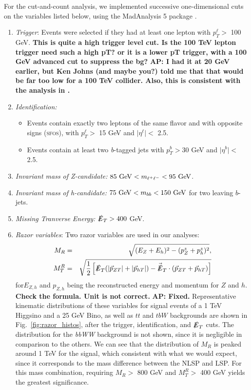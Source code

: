 \documentclass[a4paper,11pt]{article}
\providecommand{\tightlist}{%
     \setlength{\itemsep}{0pt}\setlength{\parskip}{0pt}}
\newcommand{\Shufang}[1]{{\bf\color{Maroon}  #1}}
\newcommand{\Adarsh}[1]{{\bf\color{RoyalBlue} AP: #1}}
\newcommand{\met}{{\slashed{E}_T}}
\begin{document}
For the cut-and-count analysis, we implemented successive one-dimensional cuts
on the variables listed below, using the MadAnalysis 5 package
\citep{Conte:2012fm}.

\begin{enumerate}
  \tightlist
  \item \emph{Trigger}: Events were selected if they had at least one lepton
    with $p_{T}^\ell >$ 100 GeV.  \Shufang{This is quite a high trigger level
    cut.  Is the 100 TeV lepton trigger need such a high pT? or it is a lower
  pT trigger, with a 100 GeV advanced cut to suppress the bg?} \Adarsh{I had it
at 20 GeV earlier, but Ken Johns (and maybe you?) told me that that would be
far too low for a 100 TeV collider. Also, this is consistent with the analysis
in \cite{Gori:2014oua}.}

  \item \emph{Identification:}

    \begin{itemize}
      \item Events contain exactly two leptons of the same flavor
        and with opposite signs (\textsc{sfos}), with $p_{T}^\ell >$ 15 GeV and
        $\vert\eta^\ell\vert <$ 2.5.
      \item Events contain at least two \emph{b}-tagged jets with
        $p_{T}^b > 30$ GeV and $\vert\eta^b\vert <$ 2.5.
    \end{itemize}

  \item \emph{Invariant mass of Z-candidate:}  $85\ {\rm GeV}<m_{\ell^{+}\ell^{-}}<95\ {\rm GeV}$.

  \item \emph{Invariant mass of h-candidate:} $75\ {\rm GeV}<m_{bb}<150\ {\rm GeV}$ for two leaving $b$-jets.

  \item \emph{Missing Tranverse Energy:}  $\met> 400$ GeV.

  \item \emph{Razor variables}:  Two razor variables are used in our analyses: 
\begin{align}
M_R &=& \sqrt{(E_Z+E_h)^2 - (p_Z^z + p_h^z)^2},\\
M_T^R &=& \sqrt{\frac{1}{2}\left[\slashed{E}_T(|\vec{p}_{ZT}|+|\vec{p}_{hT}|)
- \vec{\slashed{E}}_T\cdot(\vec{p}_{ZT}+\vec{p}_{hT})\right]}
\end{align}
 for$E_{Z,h}$ and $p_{Z,h}$ being the reconstructed energy and momentum for $Z$ and $h$.
 \Shufang{Check the formula.  Unit is not correct.} \Adarsh{Fixed.}
    Representative kinematic
  distributions of these variables for signal events of a 1 TeV Higgsino and a 25 GeV Bino, as well as $tt$ and $tbW$ backgrounds are
  shown in Fig.~\ref{fig:razor_histos}, after the trigger, identification, and
  $\slashed{E}_{T}$ cuts. The
  distribution for the \emph{bbWW} background is not shown, since it is negligible in
  comparison to the others.   We can see that the distribution of $M_R$ is peaked
  around 1 TeV for the signal, which consistent with what we would expect, since
  it corresponds to the mass difference between the NLSP and LSP.  For this mass combination, requiring $M_R >$ 800
  GeV and $M_T^R >$ 400 GeV yields the greatest significance.


\end{enumerate}
\end{document}
